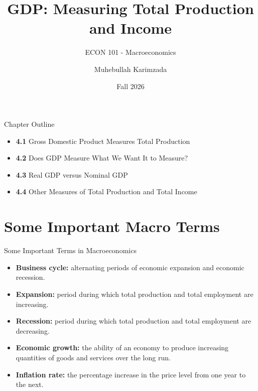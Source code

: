\documentclass[aspectratio=169]{beamer}
\title{\textbf{GDP: Measuring Total Production and Income\vspace{.5cm}\\  }}
\subtitle{ {\large ECON 101 - Macroeconomics}}
\author{Muhebullah Karimzada}
\date{Fall 2026}
\begin{document}
\begin{frame}[plain]
  \titlepage
\end{frame}

\begin{frame}{Chapter Outline}
\transfade
\begin{itemize}[<+->]
  \item \textbf{4.1} Gross Domestic Product Measures Total Production
  \item \textbf{4.2} Does GDP Measure What We Want It to Measure?
  \item \textbf{4.3} Real GDP versus Nominal GDP
  \item \textbf{4.4} Other Measures of Total Production and Total Income
\end{itemize}
\end{frame}

\section*{Some Important Macro Terms}

\begin{frame}{Some Important Terms in Macroeconomics}
\transfade
\begin{itemize}[<+->]
  \item \textbf{Business cycle:} alternating periods of economic \alert{expansion} and economic \alert{recession}.
  \item \textbf{Expansion:} period during which total production and total employment are \alert{increasing}.
  \item \textbf{Recession:} period during which total production and total employment are \alert{decreasing}.
  \item \textbf{Economic growth:} the ability of an economy to produce \alert{increasing quantities} of goods and services over the long run.
  \item \textbf{Inflation rate:} the \alert{percentage increase} in the price level from one year to the next.
\end{itemize}
\end{frame}

\end{document}
